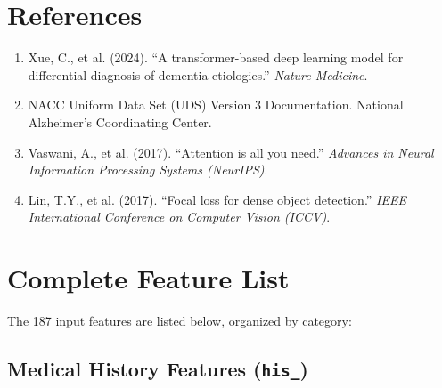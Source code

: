 \documentclass[11pt,a4paper]{article}
\begin{document}
\section{References}

\begin{enumerate}
    \item Xue, C., et al. (2024). ``A transformer-based deep learning model for differential diagnosis of dementia etiologies.'' \textit{Nature Medicine}.

    \item NACC Uniform Data Set (UDS) Version 3 Documentation. National Alzheimer's Coordinating Center.

    \item Vaswani, A., et al. (2017). ``Attention is all you need.'' \textit{Advances in Neural Information Processing Systems (NeurIPS)}.

    \item Lin, T.Y., et al. (2017). ``Focal loss for dense object detection.'' \textit{IEEE International Conference on Computer Vision (ICCV)}.
\end{enumerate}

\appendix
\section{Complete Feature List}

The 187 input features are listed below, organized by category:

\subsection{Medical History Features (\texttt{his\_})}
\end{document}
